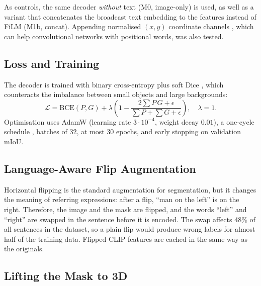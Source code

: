 \documentclass[conference,a4paper]{IEEEtran}
\begin{document}
As controls, the same decoder \emph{without} text (M0, image-only) is used, as well as a variant that
concatenates the broadcast text embedding to the features instead of FiLM (M1b, concat). Appending normalised $(x,y)$ coordinate channels \cite{liu2018coordconv}, which can help
convolutional networks with positional words, was also tested.

\subsection{Loss and Training}

The decoder is trained with binary cross-entropy plus soft Dice \cite{milletari2016vnet}, which
counteracts the imbalance between small objects and large backgrounds:
\begin{equation}
\mathcal{L} = \mathrm{BCE}(P, G) + \lambda \left(1 - \frac{2\sum P\,G + \epsilon}{\sum P + \sum G + \epsilon}\right),
\quad \lambda = 1.
\end{equation}
Optimisation uses AdamW \cite{loshchilov2019adamw} (learning rate $3\cdot10^{-4}$, weight decay
$0.01$), a one-cycle schedule \cite{smith2019onecycle}, batches of 32, at most 30 epochs, and early
stopping on validation mIoU.

\subsection{Language-Aware Flip Augmentation}

Horizontal flipping is the standard augmentation for segmentation, but it changes the meaning of
referring expressions: after a flip, \enquote{man on the left} is on the right. Therefore, the image
and the mask are flipped, and the words \enquote{left} and \enquote{right} are swapped in the sentence
before it is encoded. The swap affects 48\% of all sentences in the dataset, so a plain flip would produce
wrong labels for almost half of the training data. Flipped CLIP features are cached in the same way
as the originals.

\subsection{Lifting the Mask to 3D}
\label{sec:method-3d}
\end{document}
